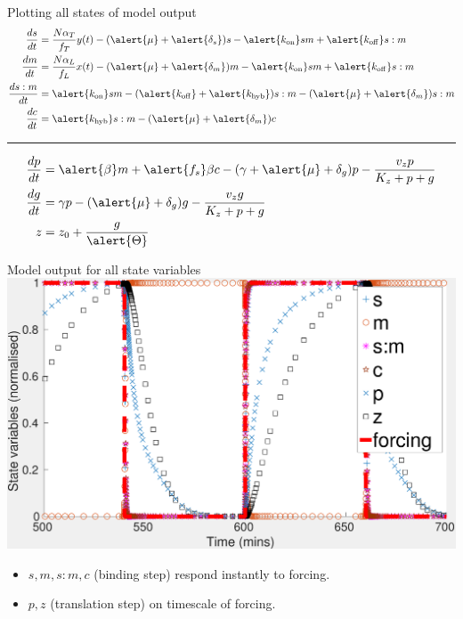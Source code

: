 \documentclass{beamer}
\begin{document}
\small
\begin{frame}{Plotting all states of model output}
\begin{align*} 
\frac{ds}{dt} &= \frac{N\alpha_{T}}{f_{T}} y(t)-(\alert{\mu} + \alert{\delta_{s}})s -\alert{k_{\mathrm{on}}}sm +\alert{k_{\mathrm{off}}}s:m \\
\frac{dm}{dt} &=  \frac{N\alpha_{L}}{f_{L}}x(t)-(\alert{\mu} + \alert{\delta_{m}})m -\alert{k_{\mathrm{on}}}sm +\alert{k_{\mathrm{off}}}s:m  \\
\frac{ds:m}{dt} & = \alert{k_{\mathrm{on}}}sm  - (\alert{k_{\mathrm{off}}}+ \alert{k_{\mathrm{hyb}}})s:m  -(\alert{\mu} + \alert{\delta_{m}} )s:m \\
\frac{dc}{dt} & = \alert{k_{\mathrm{hyb}}}s:m  -(\alert{\mu} + \alert{\delta_{m}})c  
\end{align*}
\begin{center}
\rule{0.5\textwidth}{.4pt}
\end{center}
\begin{align*}
\frac{dp}{dt} & = \alert{\beta} m +\alert{f_{s}}\beta c -(\gamma + \alert{\mu} + \delta_{g})p - \frac{v_{z}p}{K_{z}+p+g}   \\
\frac{dg}{dt} & = \gamma p - (\alert{\mu} + \delta_{g})g - \frac{v_{z}g}{K_{z}+p+g} \\
z &= z_{0} +\frac{g}{\alert{\Theta}} 
\end{align*}
\end{frame}
\normalsize


\begin{frame}{Model output for all state variables}
  \includegraphics[scale = 0.26, clip = true, trim = 0 0 0 0]{Figures/model_output}
  \begin{itemize}
    \item $s,m,s:m,c$ \alert{(binding step)} respond instantly to forcing.
    \item $p, z$ \alert{(translation step)} on timescale of forcing.
\end{itemize}
\end{frame}
\end{document}

